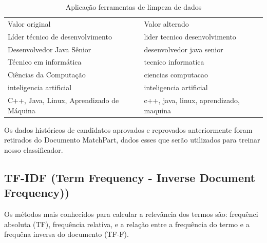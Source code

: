 \documentclass[conference]{IEEEtran}
\begin{document}
\begin{table}[h]
 \centering
 {\renewcommand\arraystretch{1.25}
\caption{Aplicação ferramentas de limpeza de dados}
 \begin{tabular}{ l l }
  \cline{1-1}\cline{2-2}  
    \multicolumn{1}{|p{3.5cm}|}{\cellcolor{}Valor original \centering } &
    \multicolumn{1}{p{3.5cm}|}{\cellcolor{}Valor alterado \centering }
  \\  
  \cline{1-1}\cline{2-2}  
    \multicolumn{1}{|p{3.0cm}|}{Líder técnico de desenvolvimento } &
    \multicolumn{1}{p{4.217cm}|}{ lider tecnico desenvolvimento}
  \\  
  \cline{1-1}\cline{2-2}  
    \multicolumn{1}{|p{3.0cm}|}{  Desenvolvedor Java Sênior } &
    \multicolumn{1}{p{4.217cm}|}{ desenvolvedor java senior}
  \\  
  \cline{1-1}\cline{2-2}  
    \multicolumn{1}{|p{3.0cm}|}{ Técnico em informática } &
    \multicolumn{1}{p{4.217cm}|}{ tecnico informatica}
  \\  
  \cline{1-1}\cline{2-2}  
    \multicolumn{1}{|p{3.0cm}|}{  Ciências da Computação} &
    \multicolumn{1}{p{4.217cm}|}{ ciencias computacao }
  \\  
  \cline{1-1}\cline{2-2}  
    \multicolumn{1}{|p{3.0cm}|}{  inteligencia artificial} &
    \multicolumn{1}{p{4.217cm}|}{ inteligencia artificial}
  \\  
  \cline{1-1}\cline{2-2}  
    \multicolumn{1}{|p{3.0cm}|}{  C++, Java, Linux, Aprendizado de Máquina  } &
    \multicolumn{1}{p{4.217cm}|}{ c++, java, linux, aprendizado, maquina }
  \\  
  \hline
 \end{tabular} }
\end{table}


Os dados históricos de candidatos aprovados e reprovados anteriormente foram retirados do Documento MatchPart, dados esses que serão utilizados para treinar nosso classificador. 


	\subsection{TF-IDF (Term Frequency - Inverse Document Frequency))}

Os métodos mais conhecidos para calcular a relevância dos termos são: frequênci  absoluta (TF), frequência relativa, e a relação entre a frequência do termo e a frequêna
  inversa do documento (TF-F).
  
\end{document}
